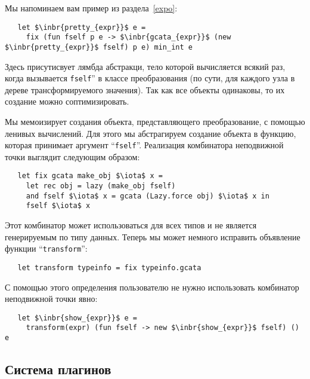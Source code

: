 Мы напоминаем вам пример из раздела~\ref{expo}:

\begin{lstlisting}
   let $\inbr{pretty_{expr}}$ e =
     fix (fun fself p e -> $\inbr{gcata_{expr}}$ (new $\inbr{pretty_{expr}}$ fself) p e) min_int e
\end{lstlisting}

Здесь присутисвует лямбда абстракци, тело которой вычисляется всякий раз, когда вызывается \lstinline{fself}'' в классе преобразования (по сути, для каждого узла в дереве трансформируемого значения). Так как все объекты одинаковы, то их создание можно соптимизировать.

Мы мемоизирует создания объекта, представляющего преобразование, с помощью ленивых вычислений. Для этого мы абстрагируем создание объекта в функцию, которая принимает
аргумент ``\lstinline{fself}''. Реализация комбинатора неподвижной точки выглядит следующим образом:

\begin{lstlisting}
   let fix gcata make_obj $\iota$ x =
     let rec obj = lazy (make_obj fself)
     and fself $\iota$ x = gcata (Lazy.force obj) $\iota$ x in
     fself $\iota$ x
\end{lstlisting}

Этот комбинатор может использоваться для всех типов и не является генерируемым по типу данных. Теперь мы может немного исправить объявление функции ``\lstinline{transform}'':

\begin{lstlisting}
   let transform typeinfo = fix typeinfo.gcata
\end{lstlisting}

С помощью этого определения пользователю не нужно использовать комбинатор неподвижной точки явно:

\begin{lstlisting}
   let $\inbr{show_{expr}}$ e =
     transform(expr) (fun fself -> new $\inbr{show_{expr}}$ fself) () e
\end{lstlisting}

\subsection{Система плагинов}
\label{plugins}

